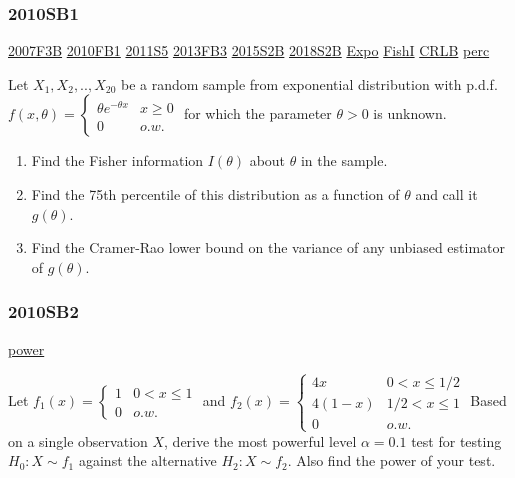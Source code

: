 \documentclass[10pt,twocolumn,portrait]{article}
\begin{document}
\hypertarget{sb1-1}{%
\subsubsection{2010SB1}\label{sb1-1}}

\protect\hyperlink{f3b}{2007F3B} \protect\hyperlink{fb1-1}{2010FB1}
\protect\hyperlink{s5-2}{2011S5} \protect\hyperlink{fb3-2}{2013FB3}
\protect\hyperlink{s2b-1}{2015S2B} \protect\hyperlink{s2b-2}{2018S2B}
\protect\hyperlink{Expo}{Expo} \protect\hyperlink{section-5}{FishI}
\protect\hyperlink{section-5}{CRLB} \protect\hyperlink{perc}{perc}

Let \(X_1,X_2,..,X_{20}\) be a random sample from exponential
distribution with p.d.f.
\(f(x,\theta)=\begin{cases}\theta e^{-\theta x}& x\ge0\\0& o.w.\end{cases}\)
for which the parameter \(\theta>0\) is unknown.

\begin{enumerate}
\def\labelenumi{(\alph{enumi})}
\item
  Find the Fisher information \(I(\theta)\) about \(\theta\) in the
  sample.
\item
  Find the 75th percentile of this distribution as a function of
  \(\theta\) and call it \(g(\theta)\).
\item
  Find the Cramer-Rao lower bound on the variance of any unbiased
  estimator of \(g(\theta)\).
\end{enumerate}

\hypertarget{sb2-1}{%
\subsubsection{2010SB2}\label{sb2-1}}

\protect\hyperlink{power}{power}

Let \(f_1(x)=\begin{cases}1&0<x\le1\\0& o.w.\end{cases}\) and
\(f_2(x)=\begin{cases}4x&0<x\le1/2\\4(1-x)& 1/2<x\le1\\0& o.w.\end{cases}\)
Based on a single observation \(X\), derive the most powerful level
\(\alpha=0.1\) test for testing \(H_0:X\sim f_1\) against the
alternative \(H_2:X\sim f_2\). Also find the power of your test.
\end{document}
